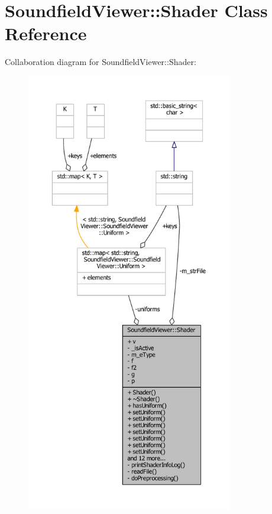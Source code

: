 \section{Soundfield\-Viewer\-:\-:Shader Class Reference}
\label{classSoundfieldViewer_1_1Shader}


Collaboration diagram for Soundfield\-Viewer\-:\-:Shader\-:\nopagebreak
\begin{figure}[H]
\begin{center}
\leavevmode
\includegraphics[height=550pt]{db/dbd/classSoundfieldViewer_1_1Shader__coll__graph}
\end{center}
\end{figure}
